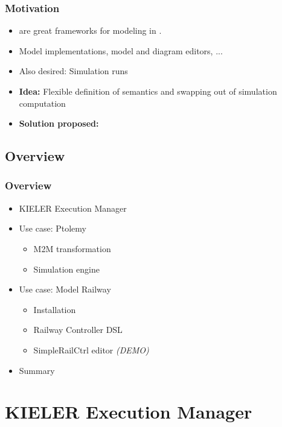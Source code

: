 \begin{frame}
  \frametitle{Motivation}
  \begin{block}{}
    \begin{itemize}
	      \item {} are great frameworks for modeling in .
	      \pause
	      \item Model implementations, model and diagram editors, ...
	      \pause
	      \item Also desired: Simulation runs
	      \pause	
	      \item \textbf{Idea:} Flexible definition of semantics and swapping out of simulation computation 
	      \pause	
	      \item \textbf{Solution proposed:} 
    \end{itemize}
  \end{block}
\end{frame}


\subsection<presentation>[Overview]{Overview}
\begin{frame}
  \frametitle{Overview}
    \begin{itemize}
	      \item KIELER Execution Manager
	      \pause
	      \item Use case: Ptolemy 
        \begin{itemize}
       	       \item M2M transformation
       	       \item Simulation engine
	             \pause
        \end{itemize}
	      \item Use case: Model Railway
        \begin{itemize}
	            \item Installation
	            \item Railway Controller DSL
	            \item SimpleRailCtrl editor \emph{(DEMO)}
        \end{itemize}
        \pause
	      \item Summary
    \end{itemize}
\end{frame}

\section[KIELER Execution Manager]{KIELER Execution Manager}

